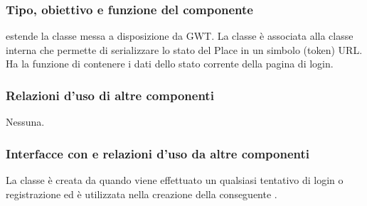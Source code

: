 \subsubsection*{Tipo, obiettivo e funzione del componente}
 estende la classe  messa a disposizione da GWT. La
classe \`e associata alla classe interna  che permette di
serializzare lo stato del Place in un simbolo (token) URL.
Ha la funzione di contenere i dati dello stato corrente della pagina di login.
\subsubsection*{Relazioni d'uso di altre componenti}
Nessuna.
\subsubsection*{Interfacce con e relazioni d'uso da altre componenti}
La classe \`e creata da  quando viene effettuato un qualsiasi
tentativo di login o registrazione ed \`e utilizzata nella creazione della
conseguente . 
